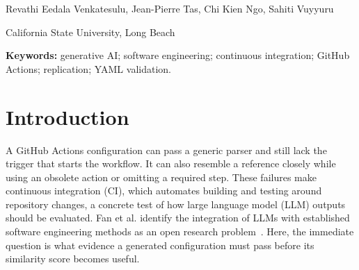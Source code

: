 \begin{center}
{\Large\bfseries\reporttitle\par}
\vspace{0.35em}
{\normalsize Revathi Eedala Venkatesulu, Jean-Pierre Tas, Chi Kien Ngo, Sahiti Vuyyuru\par}
{\small California State University, Long Beach\par}
\end{center}

\begin{abstract}
Large language models can generate continuous integration configurations, but evaluating their usefulness requires more than textual similarity. This study replicates the statistical analysis of a 2025 GitHub Actions study and extends it using 1,318 examples and 7,908 archived model outputs. We independently calculate lexical and path--value agreement, examine repeated documentation tasks, and evaluate candidate selection with parsing and a pinned static workflow checker. GPT-4o has the highest archived row-weighted mean cosine similarity, 0.688, but its paired difference from GPT-4.1 is not statistically significant. Equal weighting of source pages reverses their ranking. Consensus selection raises path--value F1 from 0.259 to 0.283 relative to syntax-only fallback; the gain persists when root-kind credit is removed, while lexical agreement decreases. On 335 examples shaped as complete workflows, checker-guided fallback accepts 284 candidates, compared with 264 for the strongest individual model, an increase of 5.97 percentage points; 51 cases receive explicit abstention. This coverage gain persists under task-pair and source-page weighting, and five candidates reach the full six-candidate coverage. A reference-integrity audit identifies preprocessing damage and perfect tree scores caused by two parsing failures. Functional correctness requires execution-based evidence and was not evaluated here.
\end{abstract}
\noindent\textbf{Keywords:} generative AI; software engineering; continuous integration; GitHub Actions; replication; YAML validation.

\section{Introduction}
A GitHub Actions configuration can pass a generic parser and still lack the trigger that starts the workflow. It can also resemble a reference closely while using an obsolete action or omitting a required step. These failures make continuous integration (CI), which automates building and testing around repository changes, a concrete test of how large language model (LLM) outputs should be evaluated. Fan et al. identify the integration of LLMs with established software engineering methods as an open research problem~\cite{fan2023}. Here, the immediate question is what evidence a generated configuration must pass before its similarity score becomes useful.

